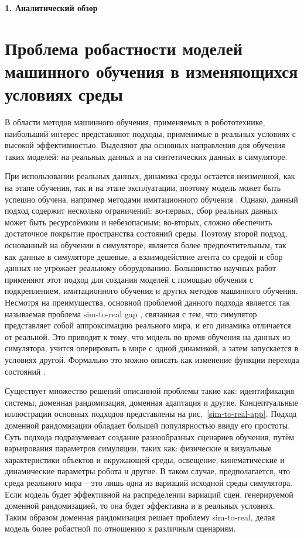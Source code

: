 \newpage
\begin{center}
  \textbf{\large 1. Аналитический обзор }
\end{center}

\section{Проблема робастности моделей машинного обучения в изменяющихся условиях среды}

       В области методов машинного обучения, применяемых в робототехнике, наибольший интерес представляют подходы, применимые в реальных условиях с высокой эффективностью. Выделяют два основных направления для обучения таких моделей: на реальных данных и на синтетических данных в симуляторе. 
    
    При использовании реальных данных, динамика среды остается неизменной, как на этапе обучения, так и на этапе эксплуатации, поэтому модель может быть успешно обучена, например методами имитационного обучения \cite{jang2017end, levine2018learning}. Однако, данный подход содержит несколько ограничений: во-первых, сбор реальных данных может быть ресурсоёмким и небезопасным; во-вторых, сложно обеспечить достаточное покрытие пространства состояний среды. Поэтому второй подход, основанный на обучении в симуляторе, является более предпочтительным, так как данные в симуляторе дешевые, а взаимодействие агента со средой и сбор данных не угрожает реальному оборудованию. Большинство научных работ применяют этот подход для создания моделей с помощью обучения с подкреплением, имитационного обучения и других методов машинного обучения. Несмотря на преимущества, основной проблемой данного подхода является так называемая проблема sim-to-real gap \cite{he2023bridging}, связанная с тем, что симулятор представляет собой аппроксимацию реального мира, и его динамика отличается от реальной. Это приводит к тому, что модель во время обучения на данных из симулятора, учится оперировать в мире с одной динамикой, а затем запускается в условиях другой. Формально это можно описать как изменение функции перехода состояний \cite{josifovski2024continual}.

    Существует множество решений описанной проблемы такие как: идентификация системы, доменная рандомизация, доменная адаптация и другие. Концептуальные иллюстрации основных подходов представлены на рис.~\ref{sim-to-real-app}. Подход доменной рандомизации обладает большей популярностью ввиду его простоты. Суть подхода подразумевает создание разнообразных сценариев обучения, путём варьирования параметров симуляции, таких как: физические и визуальные характеристики объектов и окружающей среды, освещение, кинематические и динамические параметры робота и другие. В таком случае, предполагается, что среда реального мира -- это лишь одна из вариаций исходной среды симулятора. Если модель будет эффективной на распределении вариаций сцен, генерируемой доменной рандомизацией, то она будет эффективна и в реальных условиях. Таким образом доменная рандомизация решает проблему sim-to-real, делая модель более робастной по отношению к различным сценариям.  


